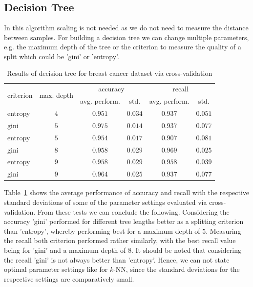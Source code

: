 \documentclass[a4paper,11pt]{article}
\begin{document}
    \subsection{Decision Tree}
        In this algorithm scaling is not needed as we do not need to measure the distance between samples. For building a decision tree we can change multiple parameters, e.g. the maximum depth of the tree or the criterion to measure the quality of a split which could be 'gini' or 'entropy'.
        
        \begin{table}[h!]
            \centering
            \begin{tabular}[h]{l|c|c|c|c|c|}
                \multirow{2}{*}{criterion} & \multirow{2}{*}{max. depth} & \multicolumn{2}{|c|}{accuracy} & \multicolumn{2}{|c|}{recall} \\
                & & avg. perform. & std. & avg. perform. & std. \\
                \hline
                entropy &$4$ & $0.951$ & $0.034$ &$0.937$ & $0.051$\\
                \hline
                gini & $5$ & $0.975$ & $0.014$ & $0.937$ & $0.077$\\\hline
                entropy & $5$ & $0.954$ & $0.017$ & $0.907$ &$0.081$\\\hline
                gini & $8$ & $0.958$  & $0.029$ & $0.969$ & $0.025$\\
                \hline
                entropy & $9$ & $0.958$ & $0.029$ & $0.958$ & $0.039$\\
                \hline
                gini & $9$ & $0.964$ & $0.025$ & $0.937$ & $0.077$
            \end{tabular}
            \caption{Results of decision tree for breast cancer dataset via cross-validation}
            \label{tbl:decision-tree_breast-cancer_cross-validation}
        \end{table}
        Table~\ref{tbl:decision-tree_breast-cancer_cross-validation} shows the average performance of accuracy and recall with the respective standard deviations of some of the parameter settings evaluated via cross-validation. 
        From these tests we can conclude the following. Considering the accuracy 'gini' performed for different tree lengths better as a splitting criterion than 'entropy', whereby performing best for a maximum depth of $5$. Measuring the recall both criterion performed rather similarly, with the best recall value being for 'gini' and a maximum depth of $8$. It should be noted that considering the recall 'gini' is not always better than 'entropy'. Hence, we can not state optimal parameter settings like for $k$-NN, since the standard deviations for the respective settings are comparatively small. 
\end{document}
